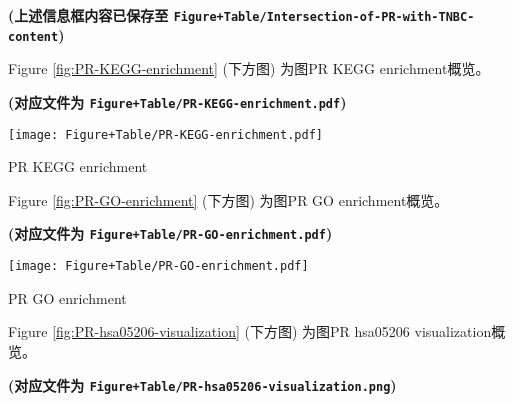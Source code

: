 \documentclass[
]{article}
\begin{document}
\textbf{(上述信息框内容已保存至 \texttt{Figure+Table/Intersection-of-PR-with-TNBC-content})}

\begin{center}\vspace{1.5cm}\end{center}

Figure \ref{fig:PR-KEGG-enrichment} (下方图) 为图PR KEGG enrichment概览。

\textbf{(对应文件为 \texttt{Figure+Table/PR-KEGG-enrichment.pdf})}

\def\@captype{figure}
\begin{center}
\texttt{[image: Figure+Table/PR-KEGG-enrichment.pdf]}
\caption{PR KEGG enrichment}\label{fig:PR-KEGG-enrichment}
\end{center}

\begin{center}\vspace{1.5cm}\end{center}

\begin{center}\vspace{1.5cm}\end{center}

Figure \ref{fig:PR-GO-enrichment} (下方图) 为图PR GO enrichment概览。

\textbf{(对应文件为 \texttt{Figure+Table/PR-GO-enrichment.pdf})}

\def\@captype{figure}
\begin{center}
\texttt{[image: Figure+Table/PR-GO-enrichment.pdf]}
\caption{PR GO enrichment}\label{fig:PR-GO-enrichment}
\end{center}

\begin{center}\vspace{1.5cm}\end{center}

\begin{center}\vspace{1.5cm}\end{center}

Figure \ref{fig:PR-hsa05206-visualization} (下方图) 为图PR hsa05206 visualization概览。

\textbf{(对应文件为 \texttt{Figure+Table/PR-hsa05206-visualization.png})}
\end{document}
